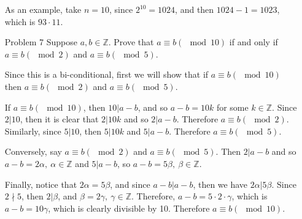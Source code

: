 \documentclass[12pt, oneside]{article}
\newcommand{\Integers}{\mathbb{Z}}
\begin{document}
\begin{itemize}
          As an example, take \(n = 10\), since \(2^{10} = 1024\), and then \(1024 - 1 = 1023\), which is \(93 \cdot 11\).

    \item[Problem 7]  Suppose \(a, b \in \Integers\). Prove that \(a \equiv b (\mod 10)\) if and only if \(a \equiv b (\mod 2)\) and  \(a \equiv b (\mod 5)\).

          Since this is a bi-conditional, first we will show that if \(a \equiv b (\mod 10)\) then \(a \equiv b (\mod 2)\) and  \(a \equiv b (\mod 5)\).

          If \(a \equiv b (\mod 10)\), then \(10 | a - b\), and so \(a-b = 10k\) for some \(k \in \Integers\). Since \(2|10\), then it is clear that \(2|10k\) and so \(2|a-b\). Therefore \(a \equiv b (\mod 2)\). Similarly, since \(5|10\), then \(5|10k\) and \(5|a-b\). Therefore \(a \equiv b (\mod 5)\).

          Conversely, say \(a \equiv b (\mod 2)\) and  \(a \equiv b (\mod 5)\). Then \(2|a-b\) and so \(a-b = 2\alpha,\ \alpha \in \Integers\) and \(5|a-b\), so \(a-b = 5\beta,\ \beta \in \Integers\).

          Finally, notice that \(2\alpha = 5\beta\), and since \(a-b | a-b\), then we have \(2\alpha | 5\beta\). Since \(2\nmid 5\), then \(2 | \beta\), and \(\beta = 2\gamma,\ \gamma \in \Integers\). Therefore, \(a-b =  5 \cdot 2 \cdot\gamma\), which is \(a-b = 10\gamma\), which is clearly divisible by 10. Therefore \(a \equiv b(\mod 10)\).


\end{itemize}
\end{document}
